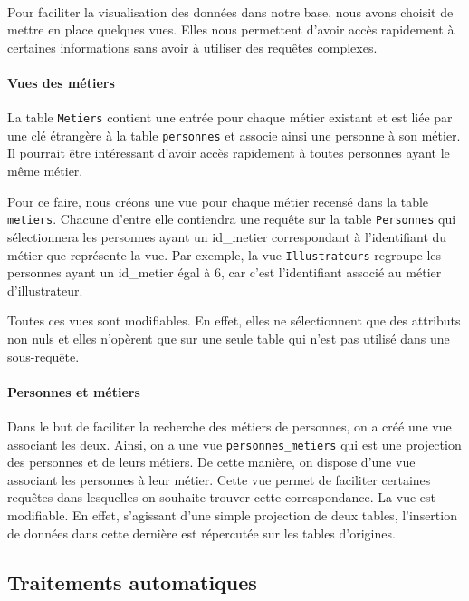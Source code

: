\paragraph{}{
    Pour faciliter la visualisation des données dans notre base, nous avons choisit de mettre en place quelques vues. Elles nous permettent d'avoir accès rapidement à certaines informations sans avoir à utiliser des requêtes complexes.
}

\paragraph{Vues des métiers}{
    La table \verb|Metiers| contient une entrée pour chaque métier existant et est liée par une clé étrangère à la table \verb|personnes| et associe ainsi une personne à son métier. Il pourrait être intéressant d'avoir accès rapidement à toutes personnes ayant le même métier. 

Pour ce faire, nous créons une vue pour chaque métier recensé dans la table \verb|metiers|. Chacune d'entre elle contiendra une requête sur la table \verb|Personnes| qui sélectionnera les personnes ayant un id\_metier correspondant à l'identifiant du métier que représente la vue. Par exemple, la vue \verb|Illustrateurs| regroupe les personnes ayant un id\_metier égal à $6$, car c'est l'identifiant associé au métier d'illustrateur.

Toutes ces vues sont modifiables. En effet, elles ne sélectionnent que des attributs non nuls et elles n'opèrent que sur une seule table qui n'est pas utilisé dans une sous-requête.
}

\paragraph{Personnes et métiers}{
    Dans le but de faciliter la recherche des métiers de personnes, on a créé une vue associant les deux. Ainsi, on a une vue \verb|personnes_metiers| qui est une projection des personnes et de leurs métiers. De cette manière, on dispose d'une vue associant les personnes à leur métier. Cette vue permet de faciliter certaines requêtes dans lesquelles on souhaite trouver cette correspondance. \newline
    La vue est modifiable. En effet, s'agissant d'une simple projection de deux tables, l'insertion de données dans cette dernière est répercutée sur les tables d'origines.
}

\subsection{Traitements automatiques}

